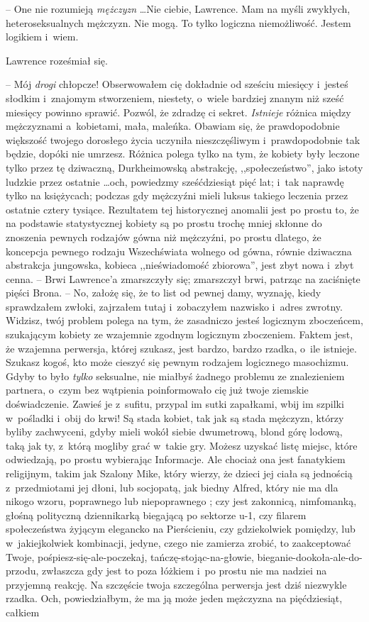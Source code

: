 \documentclass[oneside,polish,11pt,rmheadings]{mwbk}
\begin{document}
-- One nie rozumieją \textit{mężczyzn } \ldots  Nie ciebie, Lawrence. Mam na myśli zwykłych, heteroseksualnych mężczyzn. Nie mogą. To tylko logiczna niemożliwość. Jestem logikiem i~wiem. 

Lawrence roześmiał się. 

-- Mój \textit{drogi }chłopcze! Obserwowałem cię dokładnie od sześciu miesięcy i~jesteś słodkim i~znajomym stworzeniem, niestety, o~wiele bardziej znanym niż sześć miesięcy powinno sprawić. Pozwól, że zdradzę ci sekret. \textit{Istnieje }różnica między mężczyznami a~kobietami, mała, maleńka. Obawiam się, że prawdopodobnie większość twojego dorosłego życia uczyniła nieszczęśliwym i~prawdopodobnie tak będzie, dopóki nie umrzesz. Różnica polega tylko na tym, że kobiety były leczone tylko przez tę dziwaczną, Durkheimowską abstrakcję, ,,społeczeństwo'', jako istoty ludzkie przez ostatnie \ldots och, powiedzmy sześćdziesiąt pięć lat; i~tak naprawdę tylko na księżycach; podczas gdy mężczyźni mieli luksus takiego leczenia przez ostatnie cztery tysiące. Rezultatem tej historycznej anomalii jest po prostu to, że na podstawie statystycznej kobiety są po prostu trochę mniej skłonne do znoszenia pewnych rodzajów gówna niż mężczyźni, po prostu dlatego, że koncepcja pewnego rodzaju Wszechświata wolnego od gówna, równie dziwaczna abstrakcja jungowska, kobieca ,,nieświadomość zbiorowa'', jest zbyt nowa i~zbyt cenna. --  Brwi Lawrence'a zmarszczyły się; zmarszczył brwi, patrząc na zaciśnięte pięści Brona. -- No, założę się, że to list od pewnej damy, wyznaję, kiedy sprawdzałem zwłoki, zajrzałem tutaj i~zobaczyłem nazwisko i~adres zwrotny. Widzisz, twój problem polega na tym, że zasadniczo jesteś logicznym zboczeńcem, szukającym kobiety ze wzajemnie zgodnym logicznym zboczeniem. Faktem jest, że wzajemna perwersja, której szukasz, jest bardzo, bardzo rzadka, o~ile istnieje. Szukasz kogoś, kto może cieszyć się pewnym rodzajem logicznego masochizmu. Gdyby to było \textit{tylko }seksualne, nie miałbyś żadnego problemu ze znalezieniem partnera, o~czym bez wątpienia poinformowało cię już twoje ziemskie doświadczenie. Zawieś je z~sufitu, przypal im sutki zapałkami, wbij im szpilki w~pośladki i~obij do krwi! Są stada kobiet, tak jak są stada mężczyzn, którzy byliby zachwyceni, gdyby mieli wokół siebie dwumetrową, blond górę lodową, taką jak ty, z~którą mogliby grać w~takie gry. Możesz uzyskać listę miejsc, które odwiedzają, po prostu wybierając Informacje. Ale chociaż ona jest fanatykiem religijnym, takim jak Szalony Mike, który wierzy, że dzieci jej ciała są jednością z~przedmiotami jej dłoni, lub socjopatą, jak biedny Alfred, który nie ma dla nikogo wzoru, poprawnego lub niepoprawnego ; czy jest zakonnicą, nimfomanką, głośną polityczną dziennikarką biegającą po sektorze u-1, czy filarem społeczeństwa żyjącym elegancko na Pierścieniu, czy gdziekolwiek pomiędzy, lub w~jakiejkolwiek kombinacji, jedyne, czego nie zamierza zrobić, to zaakceptować Twoje, pośpiesz-się-ale-poczekaj, tańczę-stojąc-na-głowie, bieganie-dookoła-ale-do-przodu, zwłaszcza gdy jest to poza łóżkiem i~po prostu nie ma nadziei na przyjemną reakcję. Na szczęście twoja szczególna perwersja jest dziś niezwykle rzadka. Och, powiedziałbym, że ma ją może jeden mężczyzna na pięćdziesiąt, całkiem 
\end{document}
